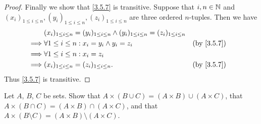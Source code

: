 \begin{proof}
  Finally we show that \cref{3.5.7} is transitive.
  Suppose that \(i, n \in \mathbb{N}\) and \((x_i)_{1 \leq i \leq n}, (y_i)_{1 \leq i \leq n}, (z_i)_{1 \leq i \leq n}\) are three ordered \(n\)-tuples.
  Then we have
  \begin{align*}
             & (x_i)_{1 \leq i \leq n} = (y_i)_{1 \leq i \leq n} \land (y_i)_{1 \leq i \leq n} = (z_i)_{1 \leq i \leq n}                 \\
    \implies & \forall 1 \leq i \leq n : x_i = y_i \land y_i = z_i                                                       &  & \by{3.5.7} \\
    \implies & \forall 1 \leq i \leq n : x_i = z_i                                                                                       \\
    \implies & (x_i)_{1 \leq i \leq n} = (z_i)_{1 \leq i \leq n}.                                                        &  & \by{3.5.7}
  \end{align*}
  Thus \cref{3.5.7} is transitive.
\end{proof}

\begin{ex}\label{ex:3.5.4}
  Let \(A\), \(B\), \(C\) be sets.
  Show that \(A \times (B \cup C) = (A \times B) \cup (A \times C)\), that \(A \times (B \cap C) = (A \times B) \cap (A \times C)\), and that \(A \times (B \setminus C) = (A \times B) \setminus (A \times C)\).
\end{ex}

